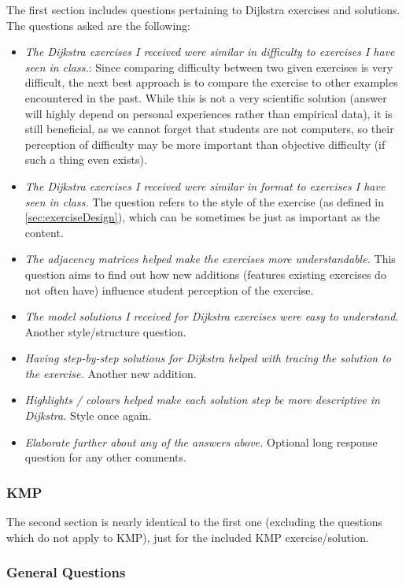 \documentclass{l4proj}
\begin{document}
The first section includes questions pertaining to Dijkstra exercises and solutions. The questions asked are the following:

\begin{itemize}
	\item
	\emph{The Dijkstra exercises I received were similar in difficulty to exercises I have seen in class.}: Since comparing difficulty between two given exercises is very difficult, the next best approach is to compare the exercise to other examples encountered in the past. While this is not a very scientific solution (answer will highly depend on personal experiences rather than empirical data), it is still beneficial, as we cannot forget that students are not computers, so their perception of difficulty may be more important than objective difficulty (if such a thing even exists).
	\item
	\emph{The Dijkstra exercises I received were similar in format to exercises I have seen in class.} The question refers to the style of the exercise (as defined in \autoref{sec:exerciseDesign}), which can be sometimes be just as important as the content.
	\item
	\emph{The adjacency matrices helped make the exercises more understandable.} This question aims to find out how new additions (features existing exercises do not often have) influence student perception of the exercise.
	\item
	\emph{The model solutions I received for Dijkstra exercises were easy to understand.} Another style/structure question.
	\item
	\emph{Having step-by-step solutions for Dijkstra helped with tracing the solution to the exercise.} Another new addition.
	\item
	\emph{Highlights / colours helped make each solution step be more descriptive in Dijkstra.} Style once again.
	\item
	\emph{Elaborate further about any of the answers above.} Optional long response question for any other comments.
\end{itemize}

\subsubsection{KMP}

The second section is nearly identical to the first one (excluding the questions which do not apply to KMP), just for the included KMP exercise/solution.

\subsubsection{General Questions}
\end{document}
